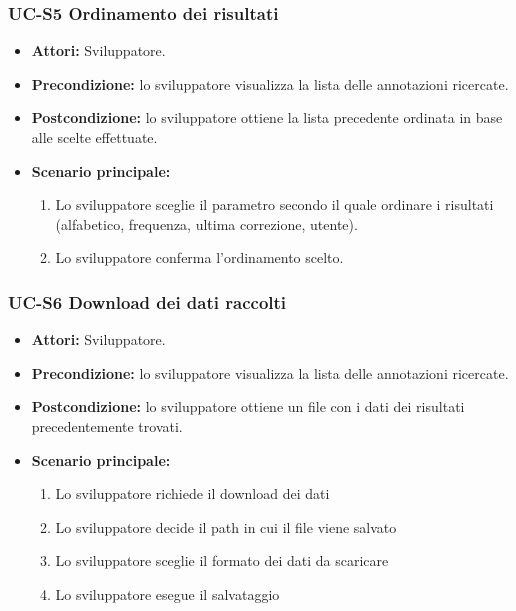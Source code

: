	\subsubsection{UC-S5 Ordinamento dei risultati}
		\begin{itemize}
			\item \textbf{Attori:} Sviluppatore.
			\item \textbf{Precondizione:} lo sviluppatore visualizza la lista delle annotazioni ricercate.
			\item \textbf{Postcondizione:} lo sviluppatore ottiene la lista precedente ordinata in base alle scelte effettuate.
			\item \textbf{Scenario principale:}
				\begin{enumerate}
					\item Lo sviluppatore sceglie il parametro secondo il quale ordinare i risultati (alfabetico, frequenza, ultima correzione, utente).
					\item Lo sviluppatore conferma l'ordinamento scelto.
				\end{enumerate}
		\end{itemize} 
	
	\subsubsection{UC-S6 Download dei dati raccolti}
		\begin{itemize}
			\item \textbf{Attori:} Sviluppatore.
			\item \textbf{Precondizione:} lo sviluppatore visualizza la lista delle annotazioni ricercate.
			\item \textbf{Postcondizione:} lo sviluppatore ottiene un file con i dati dei risultati precedentemente trovati.
			\item \textbf{Scenario principale:}
				\begin{enumerate}
					\item Lo sviluppatore richiede il download dei dati
					\item Lo sviluppatore decide il path in cui il file viene salvato
					\item Lo sviluppatore sceglie il formato dei dati da scaricare
					\item Lo sviluppatore esegue il salvataggio
				\end{enumerate}
		\end{itemize}	
		
	
